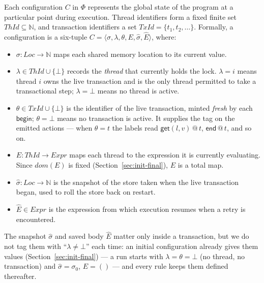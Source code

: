 \documentclass[manuscript,nonacm]{acmart}
\makeatletter
\theoremstyle{acmdefinition}
\newcommand{\Loc}{\mathit{Loc}}
\newcommand{\ThId}{\mathit{ThId}}   %
\newcommand{\TrId}{\mathit{TxId}}   %
\newcommand{\Expr}{\mathit{Expr}}
\newcommand{\bbegin}{\textsf{begin}}
\newcommand{\eend}{\textsf{end}}
\newcommand{\getev}[3]{\textsf{get}(#1,#2)\,@\,#3}
\makeatother
\begin{document}
Each configuration $C$ in $\Phi$ represents the global state of the program at a particular point during execution. Thread identifiers form a fixed finite set $\ThId \subseteq \mathbb{N}$, and transaction identifiers a set $\TrId = \{t_1, t_2, \dots\}$. Formally, a configuration is a six-tuple $C = \langle\sigma,\lambda,\theta,E,\hat{\sigma},\hat{E}\rangle$, where:

\begin{itemize}

\item \(\sigma : \Loc \rightarrow \mathbb{N}\) maps each shared memory location to its current value.

\item \(\lambda \in \ThId \cup \{\bot\}\) records the \emph{thread} that currently holds the lock. $\lambda = i$ means thread $i$ owns the live transaction and is the only thread permitted to take a transactional step; $\lambda = \bot$ means no thread is active.

\item \(\theta \in \TrId \cup \{\bot\}\) is the identifier of the live transaction, minted \emph{fresh} by each $\bbegin$; $\theta = \bot$ means no transaction is active. It supplies the tag on the emitted actions --- when $\theta = t$ the labels read $\getev{l}{v}{t}$, $\eend\,@\,t$, and so on.

\item $E : \ThId \rightarrow \Expr$ maps each thread to the expression it is currently evaluating. Since $dom(E)$ is fixed (Section~\ref{sec:init-final}), $E$ is a total map.

\item $\hat{\sigma}: \Loc \rightarrow \mathbb{N}$ is the snapshot of the store taken when the live transaction began, used to roll the store back on restart.

\item $\hat{E} \in \Expr$ is the expression from which execution resumes when a retry is encountered.

\end{itemize}

The snapshot $\hat{\sigma}$ and saved body $\hat{E}$ matter only inside a transaction, but we do not tag them with ``$\lambda \neq \bot$'' each time: an initial configuration already gives them values (Section~\ref{sec:init-final}) --- a run starts with $\lambda = \theta = \bot$ (no thread, no transaction) and $\hat{\sigma} = \sigma_0$, $\hat{E} = ()$ --- and every rule keeps them defined thereafter.
\end{document}
